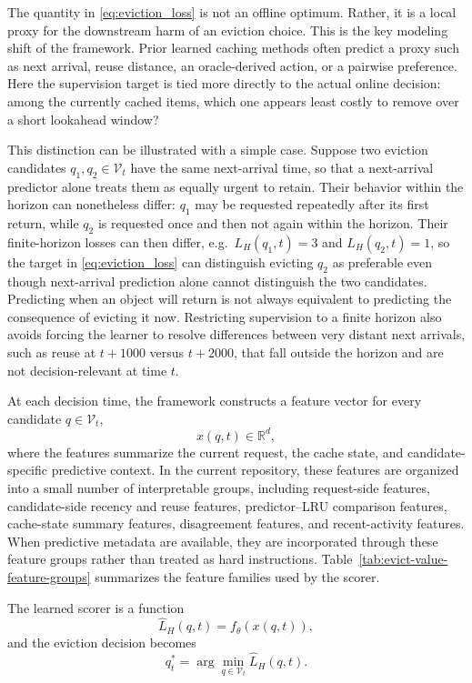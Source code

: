\documentclass[preprint,12pt]{elsarticle}
\begin{document}
The quantity in \eqref{eq:eviction_loss} is not an offline optimum. Rather, it is a local proxy for the downstream harm of an eviction choice. This is the key modeling shift of the framework. Prior learned caching methods often predict a proxy such as next arrival, reuse distance, an oracle-derived action, or a pairwise preference. Here the supervision target is tied more directly to the actual online decision: among the currently cached items, which one appears least costly to remove over a short lookahead window?

This distinction can be illustrated with a simple case. Suppose two eviction candidates $q_1, q_2 \in \mathcal{V}_t$ have the same next-arrival time, so that a next-arrival predictor alone treats them as equally urgent to retain. Their behavior within the horizon can nonetheless differ: $q_1$ may be requested repeatedly after its first return, while $q_2$ is requested once and then not again within the horizon. Their finite-horizon losses can then differ, e.g.\ $L_H(q_1,t) = 3$ and $L_H(q_2,t) = 1$, so the target in \eqref{eq:eviction_loss} can distinguish evicting $q_2$ as preferable even though next-arrival prediction alone cannot distinguish the two candidates. Predicting when an object will return is not always equivalent to predicting the consequence of evicting it now. Restricting supervision to a finite horizon also avoids forcing the learner to resolve differences between very distant next arrivals, such as reuse at $t{+}1000$ versus $t{+}2000$, that fall outside the horizon and are not decision-relevant at time $t$.

At each decision time, the framework constructs a feature vector for every candidate $q \in \mathcal{V}_t$,
\begin{equation}
x(q,t) \in \mathbb{R}^{d},
\label{eq:feature_vector}
\end{equation}
where the features summarize the current request, the cache state, and candidate-specific predictive context. In the current repository, these features are organized into a small number of interpretable groups, including request-side features, candidate-side recency and reuse features, predictor--LRU comparison features, cache-state summary features, disagreement features, and recent-activity features. When predictive metadata are available, they are incorporated through these feature groups rather than treated as hard instructions. Table~\ref{tab:evict-value-feature-groups} summarizes the feature families used by the scorer.

The learned scorer is a function
\begin{equation}
\widehat{L}_H(q,t) = f_{\theta}\!\left(x(q,t)\right),
\label{eq:predicted_loss}
\end{equation}
and the eviction decision becomes
\begin{equation}
q_t^{*} = \arg\min_{q \in \mathcal{V}_t} \widehat{L}_H(q,t).
\label{eq:eviction_rule}
\end{equation}
\end{document}
